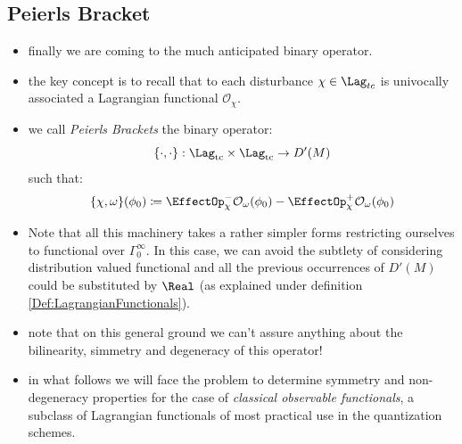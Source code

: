 \documentclass[a4paper,11pt]{scrartcl}
\begin{document}
	\subsection{Peierls Bracket}
	\begin{itemize}
		\item finally we are coming to the much anticipated binary operator.
		\item the key concept is to recall that to each disturbance $\chi \in \Lag_{tc} $ is univocally associated a Lagrangian functional $\mathcal{O}_\chi$.
		\item we call \emph{Peierls Brackets} the binary operator:
		$$ \{\cdot,\cdot\}:\Lag_{\textrm{tc}} \times \Lag_{\textrm{tc}} \rightarrow D'(M) $$
		such that:
		$$
				\{\chi, \omega \}(\phi_0) \coloneqq \EffectOp_\chi^- \mathcal{O}_\omega (\phi_0) - \EffectOp_\chi^+ \mathcal{O}_\omega(\phi_0)
		$$
		\item Note that all this machinery takes a rather simpler forms restricting ourselves to functional over $\Gamma_0^\infty$. 
		In this case, we can avoid the subtlety of considering distribution valued functional and all the previous occurrences of $D'(M)$ could be substituted by $\Real$ (as explained under definition \ref{Def:LagrangianFunctionals}).
		\item note that on this general ground we can't  assure anything about the bilinearity, simmetry and degeneracy of this operator!
		\item in what follows we will face the problem to determine  symmetry and non-degeneracy properties for the case of  \emph{classical observable functionals}, a subclass of Lagrangian functionals of most practical use in the quantization schemes.		
	\end{itemize}
\end{document}
